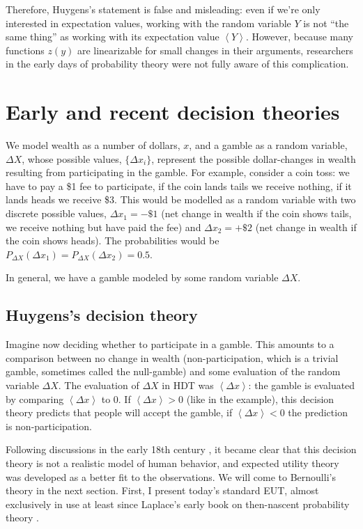 \documentclass[pdftex]{article}
\newcommand{\ave}[1]{\left\langle#1 \right\rangle}
\newcommand{\seclabel}[1]{\label{section:#1}}
\newcommand{\Dx}{{\Delta x}}
\newcommand{\DX}{{\Delta X}}
\begin{document}
Therefore, Huygens's statement is false and misleading: even if we're only interested in expectation values, working with the random variable $Y$ is not ``the same thing'' as working with its expectation value $\ave{Y}$. However, because many functions $z(y)$ are linearizable for small changes in their arguments, researchers in the early days of probability theory were not fully aware of this complication.

\section{Early and recent decision theories}
\seclabel{Early}
We model wealth as a number of dollars, $x$, and a gamble as a random variable, $\DX$, whose possible values, $\{\Dx_i\}$, represent the possible dollar-changes in wealth resulting from participating in the gamble. For example, consider a coin toss: we have to pay a \$1 fee to participate, if the coin lands tails we receive nothing, if it lands heads we receive \$3. This would be modelled as a random variable with two discrete possible values, $\Dx_1=-\$1$ (net change in wealth if the coin shows tails, we receive nothing but have paid the fee) and $\Dx_2=+\$2$ (net change in wealth if the coin shows heads). The probabilities would be $P_\DX(\Dx_1)=P_\DX(\Dx_2)=0.5$.

In general, we have a gamble modeled by some random variable $\DX$.

\subsection{Huygens's decision theory}
Imagine now deciding whether to participate in a gamble. This amounts to a comparison between no change in wealth (non-participation, which is a trivial gamble, sometimes called the null-gamble) and some evaluation of the random variable $\DX$. The evaluation of $\DX$ in HDT was $\ave{\Dx}$: the gamble is evaluated by comparing $\ave{\Dx}$ to 0. If $\ave{\Dx}>0$ (like in the example), this decision theory predicts that people will accept the gamble, if $\ave{\Dx}<0$ the prediction is non-participation.

Following discussions in the early 18th century \cite[p.~402]{Montmort1713}, it became clear that this decision theory is not a realistic model of human behavior, and expected utility theory was developed as a better fit to the observations. We will come to Bernoulli's theory in the next section. First, I present today's standard EUT, almost exclusively in use at least since Laplace's early book on then-nascent probability theory \cite{Laplace1814}. 
\end{document}
